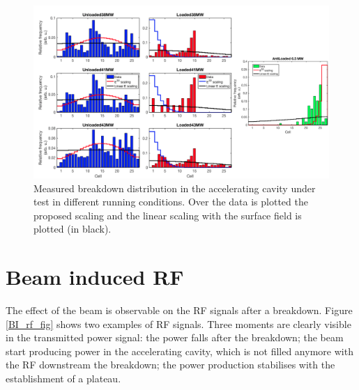 \begin{landscape}

\begin{figure}[h]
\centering 
\includegraphics[scale=0.53]{pictures/distro_all.png}
\caption{Measured breakdown distribution in the accelerating cavity under test in different running conditions. Over the data is plotted the proposed scaling and the linear scaling with the surface field is plotted (in black).}
\label{BD_distro}
\end{figure}
 
\end{landscape}





\section[Beam induced RF]{Beam induced RF}

The effect of the beam is observable on the RF signals after a breakdown. Figure \ref{BI_rf_fig}  shows two examples of RF signals. Three moments are clearly visible in the transmitted power signal: the power falls after the breakdown; the beam start producing power in the accelerating cavity, which is not filled anymore with the RF downstream the breakdown; the power production stabilises with the establishment of a plateau. 

